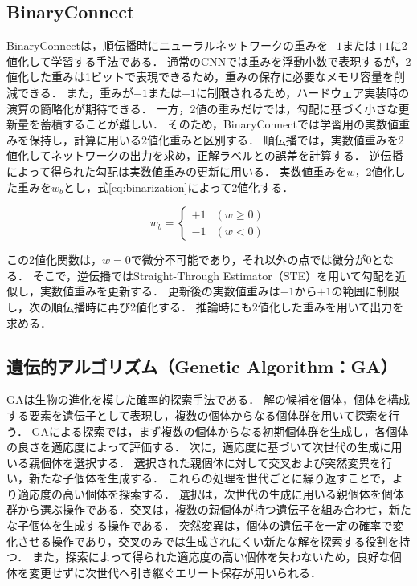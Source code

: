\documentclass[a4paper]{jarticle}
\begin{document}
\subsection{BinaryConnect}
BinaryConnectは，順伝播時にニューラルネットワークの重みを$-1$または$+1$に2値化して学習する手法である\cite{binaryconnect}．
通常のCNNでは重みを浮動小数で表現するが，2値化した重みは1ビットで表現できるため，重みの保存に必要なメモリ容量を削減できる．
また，重みが$-1$または$+1$に制限されるため，ハードウェア実装時の演算の簡略化が期待できる．
一方，2値の重みだけでは，勾配に基づく小さな更新量を蓄積することが難しい．
そのため，BinaryConnectでは学習用の実数値重みを保持し，計算に用いる2値化重みと区別する．
順伝播では，実数値重みを2値化してネットワークの出力を求め，正解ラベルとの誤差を計算する．
逆伝播によって得られた勾配は実数値重みの更新に用いる．
実数値重みを$w$，2値化した重みを$w_b$とし，式\eqref{eq:binarization}によって2値化する．

\begin{equation}
  w_b =
  \begin{cases}
    +1 & (w \geq 0) \\
    -1 & (w < 0)
  \end{cases}
  \label{eq:binarization}
\end{equation}

この2値化関数は，$w=0$で微分不可能であり，それ以外の点では微分が0となる．
そこで，逆伝播ではStraight-Through Estimator（STE）を用いて勾配を近似し，実数値重みを更新する．
更新後の実数値重みは$-1$から$+1$の範囲に制限し，次の順伝播時に再び2値化する．
推論時にも2値化した重みを用いて出力を求める．

\subsection{遺伝的アルゴリズム（Genetic Algorithm：GA）}
GAは生物の進化を模した確率的探索手法である\cite{holland1992}．
解の候補を個体，個体を構成する要素を遺伝子として表現し，複数の個体からなる個体群を用いて探索を行う．
GAによる探索では，まず複数の個体からなる初期個体群を生成し，各個体の良さを適応度によって評価する．
次に，適応度に基づいて次世代の生成に用いる親個体を選択する．
選択された親個体に対して交叉および突然変異を行い，新たな子個体を生成する．
これらの処理を世代ごとに繰り返すことで，より適応度の高い個体を探索する．
選択は，次世代の生成に用いる親個体を個体群から選ぶ操作である．交叉は，複数の親個体が持つ遺伝子を組み合わせ，新たな子個体を生成する操作である．
突然変異は，個体の遺伝子を一定の確率で変化させる操作であり，交叉のみでは生成されにくい新たな解を探索する役割を持つ．
また，探索によって得られた適応度の高い個体を失わないため，良好な個体を変更せずに次世代へ引き継ぐエリート保存が用いられる．
\end{document}
